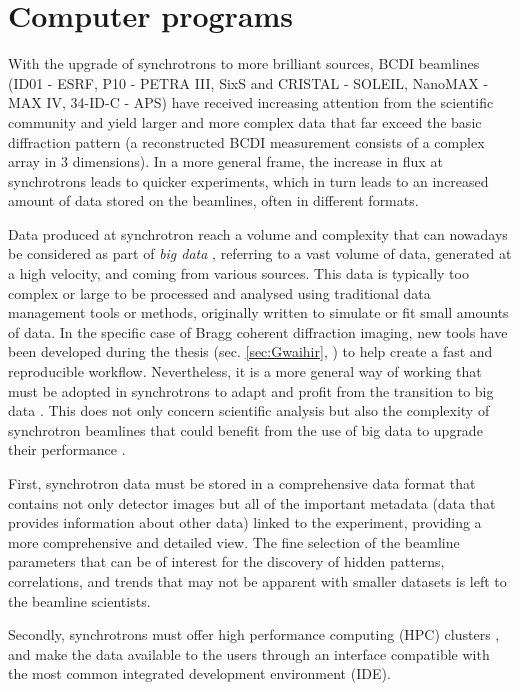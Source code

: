 \section{Computer programs}

With the upgrade of synchrotrons to more brilliant sources, BCDI beamlines (ID01 - ESRF, P10 - PETRA III, SixS and CRISTAL - SOLEIL, NanoMAX - MAX IV, 34-ID-C - APS) have received increasing attention from the scientific community and yield larger and more complex data that far exceed the basic diffraction pattern (a reconstructed BCDI measurement consists of a complex array in 3 dimensions).
In a more general frame, the increase in flux at synchrotrons leads to quicker experiments, which in turn leads to an increased amount of data stored on the beamlines, often in different formats.

Data produced at synchrotron reach a volume and complexity that can nowadays be considered as part of \textit{big data} \parencite{Alizada2017, Wang2018}, referring to a vast volume of data, generated at a high velocity, and coming from various sources.
This data is typically too complex or large to be processed and analysed using traditional data management tools or methods, originally written to simulate or fit small amounts of data.
In the specific case of Bragg coherent diffraction imaging, new tools have been developed during the thesis (sec. \ref{sec:Gwaihir}, \cite{Carnis2021c, Simonne2022}) to help create a fast and reproducible workflow.
Nevertheless, it is a more general way of working that must be adopted in synchrotrons to adapt and profit from the transition to big data \parencite{Wang2018}.
This does not only concern scientific analysis but also the complexity of synchrotron beamlines that could benefit from the use of big data to upgrade their performance \parencite{Diadem}.

First, synchrotron data must be stored in a comprehensive data format \parencite{Konnecke2015} that contains not only detector images but all of the important metadata (data that provides information about other data) linked to the experiment, providing a more comprehensive and detailed view.
The fine selection of the beamline parameters that can be of interest for the discovery of hidden patterns, correlations, and trends that may not be apparent with smaller datasets is left to the beamline scientists.

Secondly, synchrotrons must offer high performance computing (HPC) clusters \parencite{Wang2021}, and make the data available to the users through an interface compatible with the most common integrated development environment (IDE).

